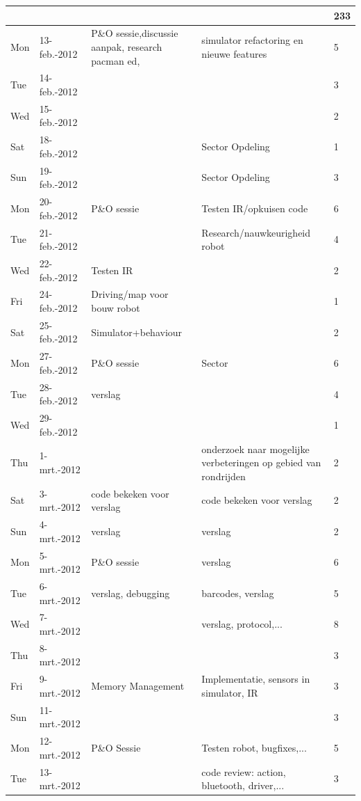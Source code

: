 \documentclass[12pt,a4paper]{report}
\begin{document}
\begin{landscape}
\begin{longtable}{llp{7cm}p{10cm}l}
\\[-1.8ex] \hline \hline
\endlastfoot
\hline
 &  &  &  & 233 \\ 
\hline
Mon & 13-feb.-2012 & P\&O sessie,discussie aanpak, research pacman ed,  & simulator refactoring en nieuwe features & 5 \\ 
\hline
Tue & 14-feb.-2012 &  &  & 3 \\ 
\hline
Wed & 15-feb.-2012 &  &  & 2 \\ 
\hline
Sat & 18-feb.-2012 &  & Sector Opdeling & 1 \\ 
\hline
Sun & 19-feb.-2012 &  & Sector Opdeling & 3 \\ 
\hline
Mon & 20-feb.-2012 & P\&O sessie & Testen IR/opkuisen code & 6 \\ 
\hline
Tue & 21-feb.-2012 &  & Research/nauwkeurigheid robot & 4 \\ 
\hline
Wed & 22-feb.-2012 & Testen IR &  & 2 \\ 
\hline
Fri & 24-feb.-2012 & Driving/map voor bouw robot &  & 1 \\ 
\hline
Sat & 25-feb.-2012 & Simulator+behaviour &  & 2 \\ 
\hline
Mon & 27-feb.-2012 & P\&O sessie & Sector & 6 \\ 
\hline
Tue & 28-feb.-2012 & verslag &  & 4 \\ 
\hline
Wed & 29-feb.-2012 &  &  & 1 \\ 
\hline
Thu & 1-mrt.-2012 &  & onderzoek naar mogelijke verbeteringen op gebied van rondrijden & 2 \\ 
\hline
Sat & 3-mrt.-2012 & code bekeken voor verslag & code bekeken voor verslag & 2 \\ 
\hline
Sun & 4-mrt.-2012 & verslag & verslag & 2 \\ 
\hline
Mon & 5-mrt.-2012 & P\&O sessie & verslag & 6 \\ 
\hline
Tue & 6-mrt.-2012 & verslag, debugging & barcodes, verslag & 5 \\ 
\hline
Wed & 7-mrt.-2012 &  & verslag, protocol,... & 8 \\ 
\hline
Thu & 8-mrt.-2012 &  &  & 3 \\ 
\hline
Fri & 9-mrt.-2012 & Memory Management & Implementatie, sensors in simulator, IR & 3 \\ 
\hline
Sun & 11-mrt.-2012 &  &  & 3 \\ 
\hline
Mon & 12-mrt.-2012 & P\&O Sessie & Testen robot, bugfixes,... & 5 \\ 
\hline
Tue & 13-mrt.-2012 &  & code review: action, bluetooth, driver,... & 3 \\ 

\end{longtable}
\end{landscape}
\end{document}
